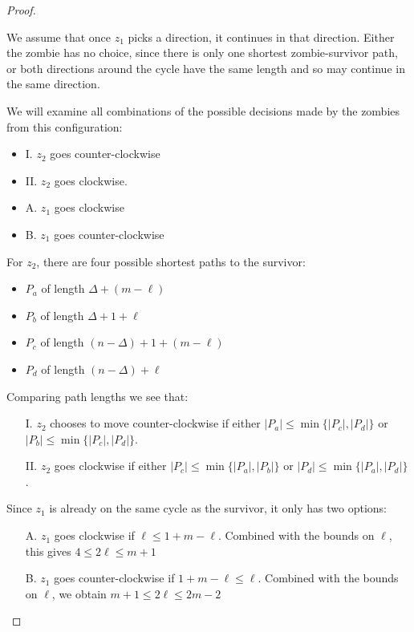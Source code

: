 \documentclass[letterpaper, 10pt]{article}
\begin{document}
\begin{proof}
\begin{proofpart}
We assume that once $z_1$ picks a direction, it continues in that direction.
Either the zombie has no choice, since there is only one shortest zombie-survivor
path, or both directions around the cycle have the same length and so
may continue in the same direction.

We will examine all combinations of the possible decisions
made by the zombies from this configuration:

\begin{itemize}
  \item I. $z_2$ goes counter-clockwise
  \item II. $z_2$ goes clockwise.
  \item A. $z_1$ goes clockwise
  \item B. $z_1$ goes counter-clockwise
\end{itemize}

For $z_2$, there are four possible shortest paths to the survivor:

\begin{itemize}
  \item $P_a$ of length $\Delta + (m - \ell)$
  \item $P_b$ of length $\Delta + 1 + \ell$
  \item $P_c$ of length $(n-\Delta) + 1 + (m-\ell)$
  \item $P_d$ of length $(n-\Delta) + \ell$
\end{itemize}

Comparing path lengths we see that:

\begin{itemize}
\item[I.] $z_2$ chooses to move counter-clockwise if either $|P_a| \leq \min \{ |P_c|, |P_d| \}$ or $|P_b| \leq \min \{ |P_c|, |P_d| \}$.

\item[II.] $z_2$ goes clockwise if either $|P_c| \leq \min \{ |P_a|, |P_b| \}$ or $|P_d| \leq \min \{ |P_a|, |P_d| \}$.
\end{itemize}

Since $z_1$ is already on the same cycle as the survivor, it only has two options:

\begin{itemize}
\item[A.] $z_1$ goes clockwise if $\ell \leq 1 + m - \ell$.
Combined with the bounds on $\ell$, this gives $4 \leq 2 \ell \leq m + 1$

\item[B.] $z_1$ goes counter-clockwise if $1 + m - \ell \leq \ell$.
Combined with the bounds on $\ell$, we obtain $m + 1 \leq 2 \ell \leq 2m - 2$
\end{itemize}


\end{proofpart}
\end{proof}
\end{document}

